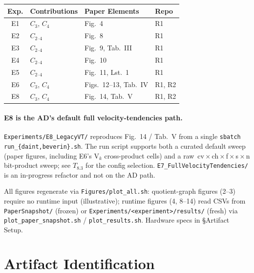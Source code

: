\documentclass[conference]{IEEEtran}
\begin{document}
\begin{center}
\small
\begin{tabular}{clll}
\toprule
Exp. & Contributions & Paper Elements & Repo \\
\midrule
E1 & $C_3$, $C_4$         & Fig.~4              & R1 \\
E2 & $C_{2\text{--}4}$    & Fig.~8              & R1 \\
E3 & $C_{2\text{--}4}$    & Fig.~9, Tab.~III    & R1 \\
E4 & $C_{2\text{--}4}$    & Fig.~10             & R1 \\
E5 & $C_{2\text{--}4}$    & Fig.~11, Lst.~1     & R1 \\
E6 & $C_3$, $C_4$         & Figs.~12--13, Tab.~IV & R1, R2 \\
E8 & $C_3$, $C_4$         & Fig.~14, Tab.~V     & R1, R2 \\
\bottomrule
\end{tabular}
\end{center}

\paragraph{E8 is the AD's default full velocity-tendencies path.}
\texttt{Experiments/E8\_LegacyVT/} reproduces Fig.~14 / Tab.~V from a single \texttt{sbatch run\_\{daint,beverin\}.sh}. The run script supports both a curated default sweep (paper figures, including E6's V$_k$ cross-product cells) and a raw \,cv\,$\times$\,ch\,$\times$\,f\,$\times$\,s\,$\times$\,n bit-product sweep; see $T_{8.3}$ for the config selection. \texttt{E7\_FullVelocityTendencies/} is an in-progress refactor and not on the AD path.

All figures regenerate via \texttt{Figures/plot\_all.sh}: quotient-graph figures (2--3) require no runtime input (illustrative); runtime figures (4, 8--14) read CSVs from \texttt{PaperSnapshot/} (frozen) or \texttt{Experiments/<experiment>/results/} (fresh) via \texttt{plot\_paper\_snapshot.sh} / \texttt{plot\_results.sh}. Hardware specs in §Artifact Setup.

\section{Artifact Identification}

\newartifact

\artrel
\end{document}
